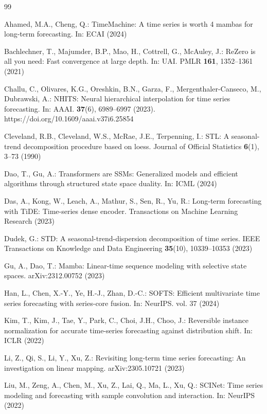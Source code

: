 \documentclass[runningheads]{llncs}
\begin{document}
\begin{thebibliography}{99}
\setlength{\itemsep}{0pt}\setlength{\parskip}{0pt}

Ahamed, M.A., Cheng, Q.: TimeMachine: A time series is worth 4 mambas for
long-term forecasting. In: ECAI (2024)

Bachlechner, T., Majumder, B.P., Mao, H., Cottrell, G., McAuley, J.:
ReZero is all you need: Fast convergence at large depth. In: UAI.
PMLR \textbf{161}, 1352--1361 (2021)

Challu, C., Olivares, K.G., Oreshkin, B.N., Garza, F.,
Mergenthaler-Canseco, M., Dubrawski, A.: NHITS: Neural hierarchical
interpolation for time series forecasting. In: AAAI. \textbf{37}(6),
6989--6997 (2023). https://doi.org/10.1609/aaai.v37i6.25854

Cleveland, R.B., Cleveland, W.S., McRae, J.E., Terpenning, I.: STL: A
seasonal-trend decomposition procedure based on loess. Journal of Official
Statistics \textbf{6}(1), 3--73 (1990)

Dao, T., Gu, A.: Transformers are SSMs: Generalized models and efficient
algorithms through structured state space duality. In: ICML (2024)

Das, A., Kong, W., Leach, A., Mathur, S., Sen, R., Yu, R.: Long-term
forecasting with TiDE: Time-series dense encoder. Transactions on Machine
Learning Research (2023)

Dudek, G.: STD: A seasonal-trend-dispersion decomposition of time series.
IEEE Transactions on Knowledge and Data Engineering \textbf{35}(10),
10339--10353 (2023)

Gu, A., Dao, T.: Mamba: Linear-time sequence modeling with selective state
spaces. arXiv:2312.00752 (2023)

Han, L., Chen, X.-Y., Ye, H.-J., Zhan, D.-C.: SOFTS: Efficient multivariate
time series forecasting with series-core fusion. In: NeurIPS. vol. 37 (2024)

Kim, T., Kim, J., Tae, Y., Park, C., Choi, J.H., Choo, J.: Reversible
instance normalization for accurate time-series forecasting against
distribution shift. In: ICLR (2022)

Li, Z., Qi, S., Li, Y., Xu, Z.: Revisiting long-term time series
forecasting: An investigation on linear mapping. arXiv:2305.10721 (2023)

Liu, M., Zeng, A., Chen, M., Xu, Z., Lai, Q., Ma, L., Xu, Q.: SCINet: Time
series modeling and forecasting with sample convolution and interaction.
In: NeurIPS (2022)


\end{thebibliography}
\end{document}
